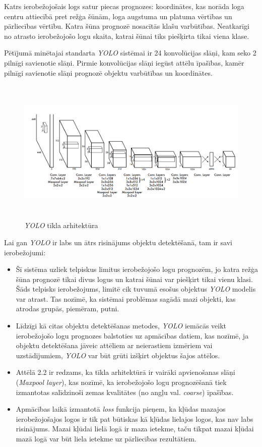 Katrs ierobežojošais logs satur piecas prognozes: koordinātes, kas norāda loga centru attiecībā pret režģa šūnām, loga augstuma un platuma vērtības un pārliecības vērtību. Katra šūna prognozē nosacītās klašu varbūtības. Neatkarīgi no atrasto ierobežojošo logu skaita, katrai šūnai tiks piešķirta tikai viena klase.

Pētījumā \cite{redmon2016you} minētajai standarta \textit{YOLO} sistēmai ir 24 konvolūcijas slāņi, kam seko 2 pilnīgi savienotie slāņi. Pirmie konvolūcijas slāņi iegūst attēlu īpašības, kamēr pilnīgi savienotie slāņi prognozē objektu varbūtības un koordinātes.

\begin{figure}[h]%
	\centering
	\includegraphics[height=7cm]{images/yoloarch.png} %
	\caption{\textit{YOLO} tīkla arhitektūra \cite{redmon2016you}}%
	\label{fig:example}%
\end{figure}
\newpage
Lai gan \textit{YOLO} ir labs un ātrs risinājums objektu detektēšanā, tam ir savi ierobežojumi:
\begin{itemize}
	\item Šī sistēma uzliek telpiskus limitus ierobežojošo logu prognozēm, jo katra režģa šūna prognozē tikai divus logus un katrai šūnai var piešķirt tikai vienu klasi. Šāds telpisks ierobežojums, limitē cik tuvumā esošus objektus \textit{YOLO} modelis var atrast. Tas nozīmē, ka sistēmai problēmas sagādā mazi objekti, kas atrodas grupās, piemēram, putni.
	\item Līdzīgi kā citas objektu detektēšanas metodes, \textit{YOLO} iemācās veikt ierobežojošo logu prognozes balstoties uz apmācības datiem, kas nozīmē, ja objektu detektēšana jāveic attēliem ar neierastiem izmēriem vai uzstādījumiem, \textit{YOLO} var būt grūti izšķirt objektus šajos attēlos.
	\item Attēlā 2.2 ir redzams, ka tīkla arhitektūrā ir vairāki apvienošanas slāņi (\textit{Maxpool layer}), kas nozīmē, ka ierobežojošo logu prognozēšanā tiek izmantotas salīdzinoši zemas kvalitātes (no angļu val. \textit{coarse}) īpašības. 
	\item Apmācības laikā izmantotā \textit{loss} funkcija pieņem, ka kļūdas mazajos ierobežojošajos logos ir tik pat būtiskas kā kļūdas lielajos logos, kas nav labs risinājums. Mazai kļūdai lielā logā ir maza ietekme, taču tikpat mazai kļūdai mazā logā var būt liela ietekme uz pārliecības rezultātiem. 
\end{itemize}   


